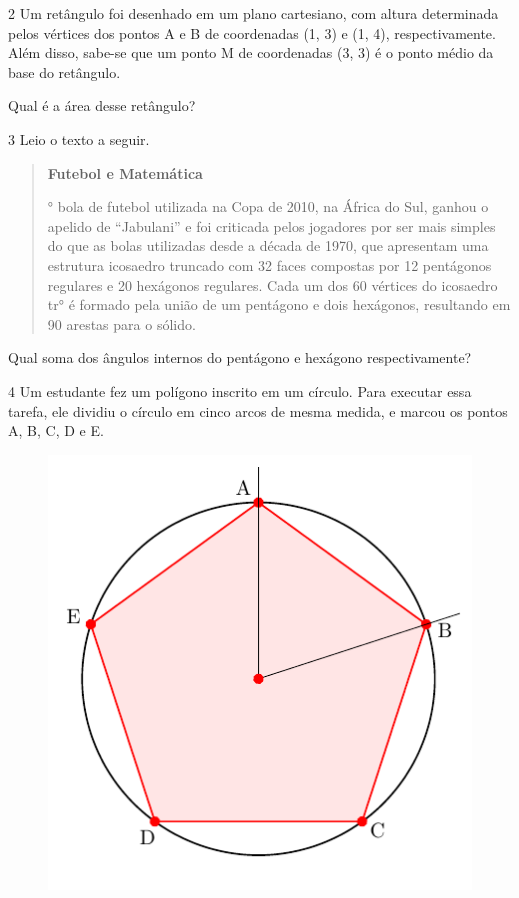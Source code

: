\num{2} Um retângulo foi desenhado em um plano cartesiano, com altura
determinada pelos vértices dos pontos A e B de coordenadas (1, 3) e (1,
4), respectivamente. Além disso, sabe-se que um ponto M de
coordenadas (3, 3) é o ponto médio da base do retângulo.

Qual é a área desse retângulo?

\begin{emptybox}
\end{emptybox}

\num{3} Leio o texto a seguir.

\begin{quote}
\textbf{Futebol e Matemática}

° bola de futebol utilizada na Copa de 2010, na África do Sul, ganhou o
apelido de ``Jabulani'' e foi criticada pelos jogadores por ser mais
simples do que as bolas utilizadas desde a década de 1970, que
apresentam uma estrutura icosaedro truncado com 32 faces compostas por
12 pentágonos regulares e 20 hexágonos regulares. Cada um dos 60
vértices do icosaedro tr° é formado pela união de um pentágono e
dois hexágonos, resultando em 90 arestas para o sólido.
\end{quote}

\pagebreak
Qual soma dos ângulos internos do pentágono e hexágono respectivamente?

\begin{emptybox}
\end{emptybox}

\num{4} Um estudante fez um polígono inscrito em um círculo. Para executar
essa tarefa, ele dividiu o círculo em cinco arcos de mesma medida, e
marcou os pontos A, B, C, D e E.

\begin{figure}[htpb!]
\centering
\includegraphics[width=.5\textwidth]{./tikz/025.pdf}
\end{figure}

